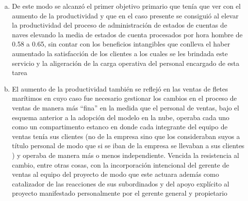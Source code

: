 \begin{enumerate}[a.]
          toda automatizaci\'on de procesos de\'ia hacerse a la medida con la
          consecuente contrataci\'on de especialistas, equipos, licencias, etc.
          o de lo contrario con la compra de un software ya echo y que deb\'ia
          pasar por un doloroso proceso de personalizaci\'on con la compra tambi\'en
          de licencias, eventualmente de equipos y siempre con la participaci\'on
          de expertos en inform\'atica, se pas\'o de pronto al empleo de aplicaciones
          en la nube listas para ser usadas desde el primer momento y que inclusive
          pod\'ian ser buscadas y encontradas en Internet con la ayuda de los
          mismos interesados sin que mediara ``un equipo de expertos de TI'',
          con la posibilidad adem\'as de usar un periodo de prueba gratuito,
          usualmente de un mes, otorgado por los proveedores
    \item De este modo se alcanz\'o el primer objetivo primario que ten\'ia que
          ver con el aumento de la productividad y que en el caso presente se
          consigui\'o al elevar la productividad del proceso de administraci\'on
          de estados de cuentas de naves elevando la media de estados de cuenta
          procesados por hora hombre de 0.58 a 0.65, sin contar con los beneficios
          intangibles que conlleva el haber aumentado la satisfacci\'on de los
          clientes a los cuales se les brindada este servicio y la aligeraci\'on
          de la carga operativa del personal encargado de esta tarea
    \item El aumento de la productividad tambi\'en se reflej\'o en las ventas de
          fletes mar\'itimos en cuyo caso fue necesario gestionar los cambios en
          el proceso de ventas de manera m\'as ``fina'' en la medida que el personal
          de ventas, bajo el esquema anterior a la adopci\'on del modelo en la
          nube, operaba cada uno como un compartimento estanco en donde cada
          integrante del equipo de ventas ten\'ia sus clientes (no de la empresa
          sino que los consideraban suyos a t\'itulo personal de modo que si se
          iban de la empresa se llevaban a sus clientes ) y operaba de manera
          m\'as o menos independiente. Vencida la resistencia al cambio, entre
          otras cosas, con la incorporaci\'on intencional del gerente de ventas
          al equipo del proyecto de modo que este actuara adem\'as como catalizador
          de las reacciones de sus subordinados y del apoyo expl\'icito al
          proyecto manifestado personalmente por el gerente general y propietario

\end{enumerate}
